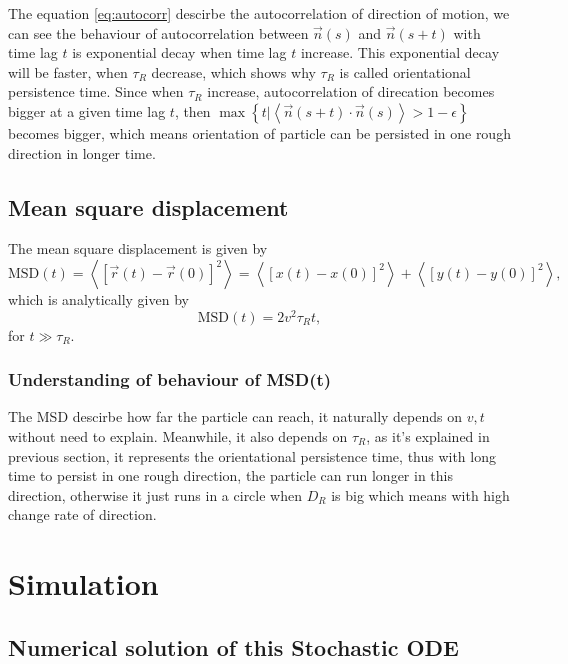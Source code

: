 \documentclass[runningheads]{llncs}
\begin{document}
The equation \eqref{eq:autocorr} descirbe the autocorrelation of direction of motion,
we can see the behaviour of autocorrelation between $\vec{n}(s)$ and $\vec{n}(s+t)$ with time lag $t$ is exponential decay when time lag $t$ increase.
This exponential decay will be faster, when $\tau_R$ decrease, which shows why $\tau_R$ is called orientational persistence time.
Since when $\tau_R$ increase, autocorrelation of direcation becomes bigger at a given time lag $t$,
then $\max\left\{ t|\left\langle\vec{n}(s+t)\cdot\vec{n}(s)\right\rangle>1-\epsilon\right\}$ becomes bigger,
which means orientation of particle can be persisted in one rough direction in longer time.

\subsection{Mean square displacement}
The mean square displacement is given by
\begin{equation}
    \text{MSD}(t)=\left\langle \left[\vec{r}(t)-\vec{r}(0)\right]^2 \right\rangle=\left\langle\left[x(t)-x(0)\right]^2 \right\rangle+\left\langle\left[y(t)-y(0)\right]^2 \right\rangle,
\end{equation}
which is analytically given by 
\begin{equation}
    \label{eq:MSD}
    \text{MSD}(t)=2v^2\tau_R t,
\end{equation}
for $t\gg \tau_R$.

\subsubsection{Understanding of behaviour of MSD(t)}
\hfill\break

The MSD descirbe how far the particle can reach, it naturally depends on $v,t$ without need to explain.
Meanwhile, it also depends on $\tau_R$, as it's explained in previous section,
it represents the orientational persistence time, thus with long time to persist in one rough direction,
the particle can run longer in this direction,
otherwise it just runs in a circle when $D_R$ is big which means with high change rate of direction.
\section{Simulation}

\subsection{Numerical solution of this Stochastic ODE}
\end{document}
